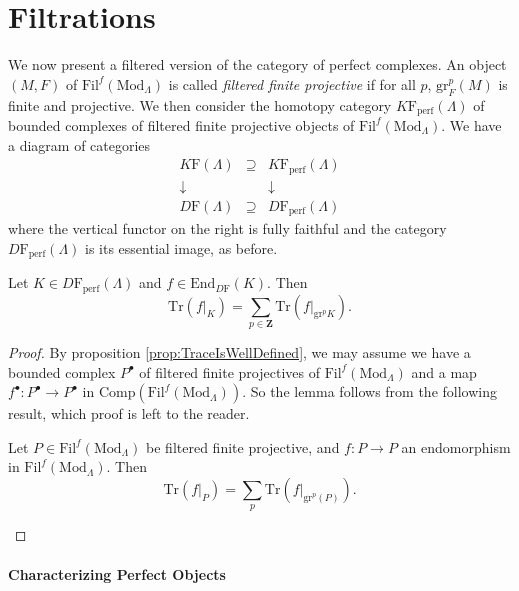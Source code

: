 \section{Filtrations} 

We now present a filtered version of the category of perfect complexes. An 
object $(M,F)$ of $\text{Fil}^f(\text{Mod}_\Lambda)$ is called \emph{filtered 
finite projective} if for all $p$, $\text{gr}^p_F (M)$ is finite and 
projective. We then consider the homotopy category 
$K\mathrm{F}_{\text{perf}}(\Lambda)$ of bounded complexes of filtered finite 
projective objects of $\text{Fil}^f(\text{Mod}_\Lambda)$. We have a diagram of 
categories
$$
\begin{array}{ccccc}
K\mathrm{F}(\Lambda) & \supseteq & K\mathrm{F}_{\text{perf}}(\Lambda)\\
\downarrow & & \downarrow\\
D\mathrm{F}(\Lambda)  & \supseteq & D\mathrm{F}_{\text{perf}}(\Lambda)
\end{array}
$$
where the vertical functor on the right is fully faithful and the category 
$D\mathrm{F}_{\text{perf}}(\Lambda)$ is its essential image, as before.

\begin{lemma}[Additivity] 
Let $K\in D\mathrm{F}_{\text{perf}}(\Lambda)$ and $f\in 
\text{End}_{D\mathrm{F}}(K)$. Then 
$$
\text{Tr}(f|_K) = \sum_{p\in \mathbf{Z}} \text{Tr}(f|_{\text{gr}^p K}).
$$
\end{lemma}

\begin{proof} 
By proposition \ref{prop:TraceIsWellDefined}, we may assume we have a bounded 
complex $P^\bullet$ of filtered finite projectives of 
$\text{Fil}^f(\text{Mod}_\Lambda)$ and a map $f^\bullet: P^\bullet\to 
P^\bullet$ in $\text{Comp}(\text{Fil}^f(\text{Mod}_\Lambda))$. So the lemma 
follows from the following result, which proof is left to the reader.

\begin{lemma}
Let $P \in \text{Fil}^f(\text{Mod}_\Lambda)$ be filtered finite projective, and 
$f: P \to P$ an endomorphism in $\text{Fil}^f(\text{Mod}_\Lambda)$. Then
$$
\text{Tr}(f|_P) = \sum_p \text{Tr}(f|_{\text{gr}^p(P)}).
$$
\end{lemma}
\end{proof}

\paragraph{Characterizing Perfect Objects} 

